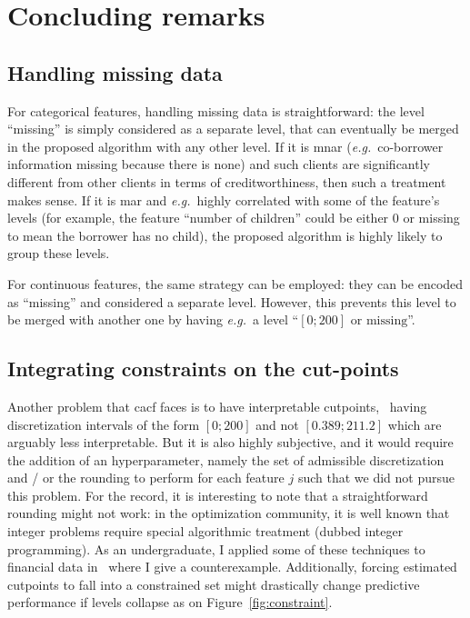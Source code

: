 \section{Concluding remarks}

\subsection{Handling missing data}

For categorical features, handling missing data is straightforward: the level ``missing'' is simply considered as a separate level, that can eventually be merged in the proposed algorithm with any other level. If it is \gls{mnar} (\textit{e.g.}\ co-borrower information missing because there is none) and such clients are significantly different from other clients in terms of creditworthiness, then such a treatment makes sense. If it is \gls{mar} and \textit{e.g.}\ highly correlated with some of the feature's levels (for example, the feature ``number of children'' could be either $0$ or missing to mean the borrower has no child), the proposed algorithm is highly likely to group these levels.

For continuous features, the same strategy can be employed: they can be encoded as ``missing'' and considered a separate level. However, this prevents this level to be merged with another one by having \textit{e.g.}\ a level ``$[0;200] \text{ or missing}$''.

\subsection{Integrating constraints on the cut-points}

Another problem that \gls{cacf} faces is to have interpretable cutpoints, \ having discretization intervals of the form $[0;200]$ and not $[0.389 ; 211.2]$ which are arguably less interpretable. But it is also highly subjective, and it would require the addition of an hyperparameter, namely the set of admissible discretization and / or the rounding to perform for each feature $j$ such that we did not pursue this problem. For the record, it is interesting to note that a straightforward rounding might not work: in the optimization community, it is well known that integer problems require special algorithmic treatment (dubbed integer programming). As an undergraduate, I applied some of these techniques to financial data in~\cite{projet_recherche} where I give a counterexample. Additionally, forcing estimated cutpoints to fall into a constrained set might drastically change predictive performance if levels collapse as on Figure~\ref{fig:constraint}.

